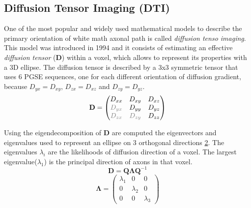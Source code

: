  \begin{figure}[h]
    \centering
    \caption{}
    \label{fig:isotropiAnisotropi}
 \end{figure}

 \subsection{Diffusion Tensor Imaging (DTI)}
 One of the most popular and widely used mathematical models to describe the primary orientation of white math axonal path is called \emph{diffusion tenso imaging}. This model was introduced in 1994 \cite{basser1994mr} and it consists of estimating an effective \emph{diffusion tensor} ($\mathbf{D}$) within a voxel, which allows to represent its properties with a 3D ellipse. The diffusion tensor is described by a 3x3 symmetric tensor that uses 6 PGSE sequences, one for each different orientation of diffusion gradient, because $D_{yx}=D_{xy}$, $D_{zx}=D_{xz}$ and $D_{zy}=D_{yz}$.
 \begin{equation}
    \mathbf{D} = 
    \begin{pmatrix}
        D_{xx} & D_{xy} & D_{xz} \\
        \textcolor{gray}{D_{yx}} & D_{yy} & D_{yz} \\
        \textcolor{gray}{D_{zx}} & \textcolor{gray}{D_{zy}} & D_{zz}
    \end{pmatrix}
 \end{equation}

 Using the eigendecomposition of $\mathbf{D}$ are computed the eigenvectors and eigenvalues used to represent an ellipse on 3 orthogonal directions \ref{fig:elipse}. The eigenvalues $\lambda_{i}$ are the likelihoods of diffusion direction of a voxel. The largest eigenvalue($\lambda_1$) is the principal direction of axons in that voxel.
 \[\mathbf{D}=\mathbf{Q}\mathbf{\Lambda}\mathbf{Q}^{-1}\]
 \begin{equation}
    \mathbf{\Lambda} = 
    \begin{pmatrix}
        \lambda_{1} & 0 & 0 \\
        0 & \lambda_{2} & 0 \\
        0 & 0 & \lambda_{3}
    \end{pmatrix}
 \end{equation}

 \begin{figure}[h]
    \centering
    \caption{}
    \label{fig:elipse}
 \end{figure}

